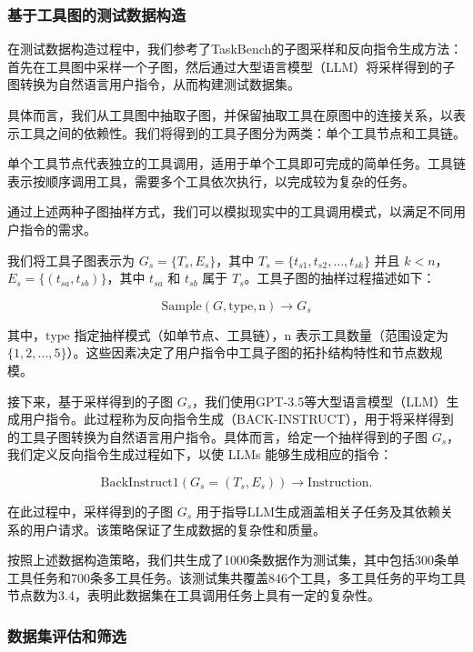 \subsubsection{基于工具图的测试数据构造}

在测试数据构造过程中，我们参考了TaskBench的子图采样和反向指令生成方法：首先在工具图中采样一个子图，然后通过大型语言模型（LLM）将采样得到的子图转换为自然语言用户指令，从而构建测试数据集。

具体而言，我们从工具图中抽取子图，并保留抽取工具在原图中的连接关系，以表示工具之间的依赖性。我们将得到的工具子图分为两类：单个工具节点和工具链。

单个工具节点代表独立的工具调用，适用于单个工具即可完成的简单任务。工具链表示按顺序调用工具，需要多个工具依次执行，以完成较为复杂的任务。

通过上述两种子图抽样方式，我们可以模拟现实中的工具调用模式，以满足不同用户指令的需求。

我们将工具子图表示为 \( G_s = \{T_s, E_s\} \)，其中 \( T_s = \{t_{s1}, t_{s2}, \dots, t_{sk}\} \) 并且 \( k < n \)，\( E_s = \{(t_{sa}, t_{sb})\} \)，其中 \( t_{sa} \) 和 \( t_{sb} \) 属于 \( T_s \)。工具子图的抽样过程描述如下：

\[
\text{Sample}(G, \text{type}, \text{n}) \rightarrow G_s
\]

其中，\(\text{type}\) 指定抽样模式（如单节点、工具链），\(\text{n}\) 表示工具数量（范围设定为 \(\{1, 2, \dots, 5\}\)）。这些因素决定了用户指令中工具子图的拓扑结构特性和节点数规模。

接下来，基于采样得到的子图 \( G_s \)，我们使用GPT-3.5等大型语言模型（LLM）生成用户指令。此过程称为反向指令生成（BACK-INSTRUCT），用于将采样得到的工具子图转换为自然语言用户指令。具体而言，给定一个抽样得到的子图 \( G_s \)，我们定义反向指令生成过程如下，以使 LLMs 能够生成相应的指令：

\[
\text{BackInstruct1}(G_s = (T_s, E_s)) \rightarrow \text{Instruction}.
\]

在此过程中，采样得到的子图 \( G_s \) 用于指导LLM生成涵盖相关子任务及其依赖关系的用户请求。该策略保证了生成数据的复杂性和质量。

按照上述数据构造策略，我们共生成了1000条数据作为测试集，其中包括300条单工具任务和700条多工具任务。该测试集共覆盖846个工具，多工具任务的平均工具节点数为3.4，表明此数据集在工具调用任务上具有一定的复杂性。

\subsubsection{数据集评估和筛选}

